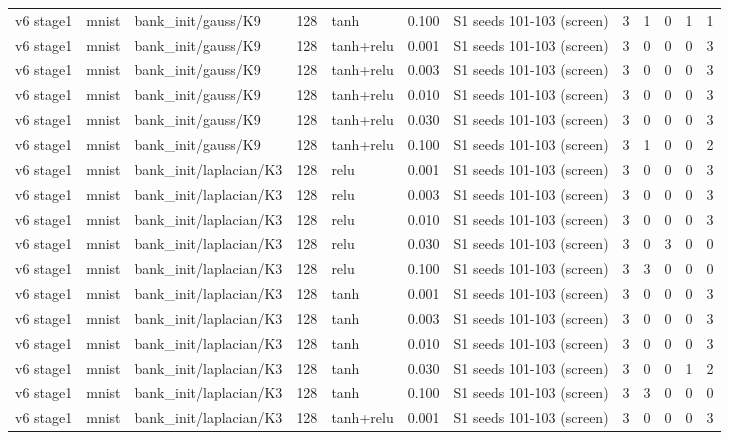 \begin{table}[htbp]
{\begin{tabular}{@{}lllrlrlrrrrr@{}}
v6 stage1 & mnist & bank\_init/gauss/K9 & 128 & tanh & 0.100 & S1 seeds 101-103 (screen) & 3 & 1 & 0 & 1 & 1 \\
v6 stage1 & mnist & bank\_init/gauss/K9 & 128 & tanh+relu & 0.001 & S1 seeds 101-103 (screen) & 3 & 0 & 0 & 0 & 3 \\
v6 stage1 & mnist & bank\_init/gauss/K9 & 128 & tanh+relu & 0.003 & S1 seeds 101-103 (screen) & 3 & 0 & 0 & 0 & 3 \\
v6 stage1 & mnist & bank\_init/gauss/K9 & 128 & tanh+relu & 0.010 & S1 seeds 101-103 (screen) & 3 & 0 & 0 & 0 & 3 \\
v6 stage1 & mnist & bank\_init/gauss/K9 & 128 & tanh+relu & 0.030 & S1 seeds 101-103 (screen) & 3 & 0 & 0 & 0 & 3 \\
v6 stage1 & mnist & bank\_init/gauss/K9 & 128 & tanh+relu & 0.100 & S1 seeds 101-103 (screen) & 3 & 1 & 0 & 0 & 2 \\
v6 stage1 & mnist & bank\_init/laplacian/K3 & 128 & relu & 0.001 & S1 seeds 101-103 (screen) & 3 & 0 & 0 & 0 & 3 \\
v6 stage1 & mnist & bank\_init/laplacian/K3 & 128 & relu & 0.003 & S1 seeds 101-103 (screen) & 3 & 0 & 0 & 0 & 3 \\
v6 stage1 & mnist & bank\_init/laplacian/K3 & 128 & relu & 0.010 & S1 seeds 101-103 (screen) & 3 & 0 & 0 & 0 & 3 \\
v6 stage1 & mnist & bank\_init/laplacian/K3 & 128 & relu & 0.030 & S1 seeds 101-103 (screen) & 3 & 0 & 3 & 0 & 0 \\
v6 stage1 & mnist & bank\_init/laplacian/K3 & 128 & relu & 0.100 & S1 seeds 101-103 (screen) & 3 & 3 & 0 & 0 & 0 \\
v6 stage1 & mnist & bank\_init/laplacian/K3 & 128 & tanh & 0.001 & S1 seeds 101-103 (screen) & 3 & 0 & 0 & 0 & 3 \\
v6 stage1 & mnist & bank\_init/laplacian/K3 & 128 & tanh & 0.003 & S1 seeds 101-103 (screen) & 3 & 0 & 0 & 0 & 3 \\
v6 stage1 & mnist & bank\_init/laplacian/K3 & 128 & tanh & 0.010 & S1 seeds 101-103 (screen) & 3 & 0 & 0 & 0 & 3 \\
v6 stage1 & mnist & bank\_init/laplacian/K3 & 128 & tanh & 0.030 & S1 seeds 101-103 (screen) & 3 & 0 & 0 & 1 & 2 \\
v6 stage1 & mnist & bank\_init/laplacian/K3 & 128 & tanh & 0.100 & S1 seeds 101-103 (screen) & 3 & 3 & 0 & 0 & 0 \\
v6 stage1 & mnist & bank\_init/laplacian/K3 & 128 & tanh+relu & 0.001 & S1 seeds 101-103 (screen) & 3 & 0 & 0 & 0 & 3 \\

\end{tabular}}
\end{table}
